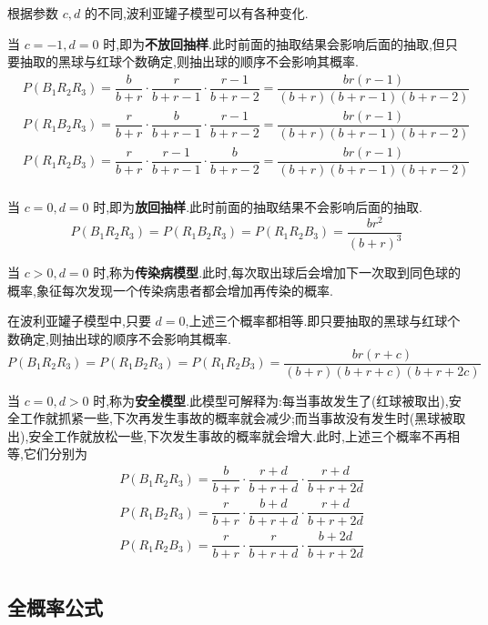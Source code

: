 \begin{note}
    \indent 根据参数 $c,d$ 的不同,波利亚罐子模型可以有各种变化.

    当 $c=-1, d=0$ 时,即为\textbf{不放回抽样}.此时前面的抽取结果会影响后面的抽取,但只要抽取的黑球与红球个数确定,则抽出球的顺序不会影响其概率.
    $$
    \begin{aligned}
        & P(B_1 R_2 R_3) = \dfrac{b}{b+r} \cdot \dfrac{r}{b+r-1} \cdot \dfrac{r-1}{b+r-2} = \dfrac{br(r-1)}{(b+r)(b+r-1)(b+r-2)} \\
        & P(R_1 B_2 R_3) = \dfrac{r}{b+r} \cdot \dfrac{b}{b+r-1} \cdot \dfrac{r-1}{b+r-2} = \dfrac{br(r-1)}{(b+r)(b+r-1)(b+r-2)} \\
        & P(R_1 R_2 B_3) = \dfrac{r}{b+r} \cdot \dfrac{r-1}{b+r-1} \cdot \dfrac{b}{b+r-2} = \dfrac{br(r-1)}{(b+r)(b+r-1)(b+r-2)} \\
    \end{aligned}
    $$

    当 $c=0, d=0$ 时,即为\textbf{放回抽样}.此时前面的抽取结果不会影响后面的抽取.
    $$
    P(B_1 R_2 R_3) = P(R_1 B_2 R_3) = P(R_1 R_2 B_3) = \dfrac{br^2}{(b+r)^3}
    $$

    当 $c>0, d=0$ 时,称为\textbf{传染病模型}.此时,每次取出球后会增加下一次取到同色球的概率,象征每次发现一个传染病患者都会增加再传染的概率.

    在波利亚罐子模型中,只要 $d=0$,上述三个概率都相等.即只要抽取的黑球与红球个数确定,则抽出球的顺序不会影响其概率.
    $$
    P(B_1 R_2 R_3) = P(R_1 B_2 R_3) = P(R_1 R_2 B_3) = \dfrac{br(r+c)}{(b+r)(b+r+c)(b+r+2c)}
    $$

    当 $c=0, d>0$ 时,称为\textbf{安全模型}.此模型可解释为:每当事故发生了(红球被取出),安全工作就抓紧一些,下次再发生事故的概率就会减少;而当事故没有发生时(黑球被取出),安全工作就放松一些,下次发生事故的概率就会增大.此时,上述三个概率不再相等,它们分别为
    $$
    \begin{aligned}
        & P(B_1 R_2 R_3) = \dfrac{b}{b+r} \cdot \dfrac{r+d}{b+r+d} \cdot \dfrac{r+d}{b+r+2d} \\
        & P(R_1 B_2 R_3) = \dfrac{r}{b+r} \cdot \dfrac{b+d}{b+r+d} \cdot \dfrac{r+d}{b+r+2d} \\
        & P(R_1 R_2 B_3) = \dfrac{r}{b+r} \cdot \dfrac{r}{b+r+d} \cdot \dfrac{b+2d}{b+r+2d} \\
    \end{aligned}
    $$
\end{note}

\subsection{全概率公式}


